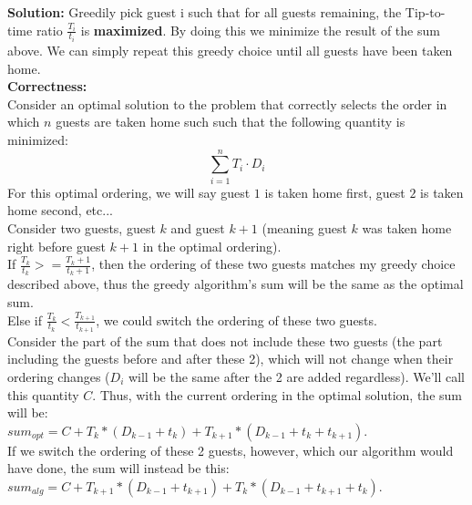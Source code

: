 \documentclass[10pt]{article}
\newcommand{\solution}[1]{\color{blue}\hfill\break\noindent\textbf{Solution:} #1\color{black}}
\begin{document}
\solution{
    Greedily pick guest i such that for all guests remaining, the Tip-to-time ratio $\frac{T_i}{t_i}$ is \textbf{maximized}. By doing this we minimize the result of the sum above. We can simply repeat this greedy choice until all guests have been taken home. \\
    \textbf{Correctness:} \\
    Consider an optimal solution to the problem that correctly selects the order in which $n$ guests are taken home such such that the following quantity is minimized: \[ \sum_{i=1}^{n} T_i \cdot D_i \]
    For this optimal ordering, we will say guest $1$ is taken home first, guest $2$ is taken home second, etc... \\ Consider two guests, guest $k$ and guest $k+1$ (meaning guest $k$ was taken home right before guest $k+1$ in the optimal ordering). \\ 
    If $\frac{T_{k}}{t_{k}} >= \frac{T_k+1}{t_k+1}$, then the ordering of these two guests matches my greedy choice described above, thus the greedy algorithm's sum will be the same as the optimal sum. \\
    Else if $\frac{T_k}{t_k} < \frac{T_{k+1}}{t_{k+1}}$, we could switch the ordering of these two guests. \\ Consider the part of the sum that does not include these two guests (the part including the guests before and after these 2), which will not change when their ordering changes ($D_i$ will be the same after the 2 are added regardless). We'll call this quantity $C$. Thus, with the current ordering in the optimal solution, the sum will be: \\
    $sum_{opt} = C + T_k * (D_{k-1} + t_k) + T_{k+1} * (D_{k-1} + t_k + t_{k+1})$. \\
    If we switch the ordering of these 2 guests, however, which our algorithm would have done, the sum will instead be this: \\
    $sum_{alg} = C + T_{k+1} * (D_{k-1} + t_{k+1}) + T_k * (D_{k-1} + t_{k+1} + t_k)$. \\
    
}
\end{document}
